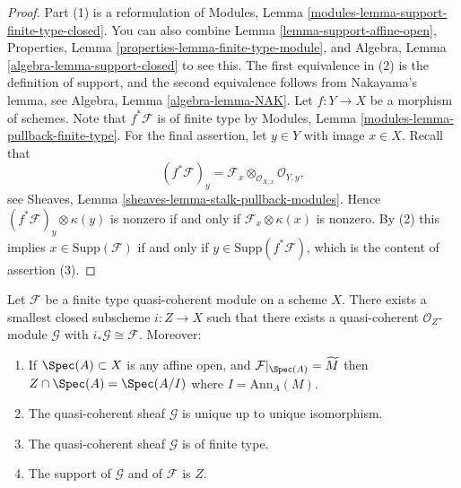 \begin{proof}
Part (1) is a reformulation of
Modules, Lemma \ref{modules-lemma-support-finite-type-closed}.
You can also combine
Lemma \ref{lemma-support-affine-open},
Properties, Lemma \ref{properties-lemma-finite-type-module},
and
Algebra, Lemma \ref{algebra-lemma-support-closed}
to see this. The first equivalence in (2) is the definition
of support, and the second equivalence follows from
Nakayama's lemma, see
Algebra, Lemma \ref{algebra-lemma-NAK}.
Let $f : Y \to X$ be a morphism of schemes. Note that
$f^*\mathcal{F}$ is of finite type by
Modules, Lemma \ref{modules-lemma-pullback-finite-type}.
For the final assertion, let $y \in Y$ with image $x \in X$.
Recall that
$$
(f^*\mathcal{F})_y =
\mathcal{F}_x \otimes_{\mathcal{O}_{X, x}} \mathcal{O}_{Y, y},
$$
see
Sheaves, Lemma \ref{sheaves-lemma-stalk-pullback-modules}.
Hence $(f^*\mathcal{F})_y \otimes \kappa(y)$ is nonzero
if and only if $\mathcal{F}_x \otimes \kappa(x)$ is nonzero.
By (2) this implies $x \in \text{Supp}(\mathcal{F})$ if and only
if $y \in \text{Supp}(f^*\mathcal{F})$, which is the content of
assertion (3).
\end{proof}

\begin{lemma}
\label{lemma-scheme-theoretic-support}
Let $\mathcal{F}$ be a finite type quasi-coherent module
on a scheme $X$. There exists a smallest closed subscheme
$i : Z \to X$ such that there exists a quasi-coherent
$\mathcal{O}_Z$-module $\mathcal{G}$ with
$i_*\mathcal{G} \cong \mathcal{F}$. Moreover:
\begin{enumerate}
\item If $\Spec(A) \subset X$ is any affine open, and
$\mathcal{F}|_{\Spec(A)} = \widetilde{M}$ then
$Z \cap \Spec(A) = \Spec(A/I)$ where $I = \text{Ann}_A(M)$.
\item The quasi-coherent sheaf $\mathcal{G}$ is unique up to unique
isomorphism.
\item The quasi-coherent sheaf $\mathcal{G}$ is of finite type.
\item The support of $\mathcal{G}$ and of $\mathcal{F}$ is $Z$.
\end{enumerate}
\end{lemma}

